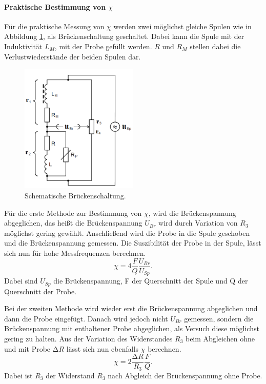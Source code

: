 \paragraph{Praktische Bestimmung von $\chi$}
Für die praktische Messung von $\chi$ werden zwei möglichst gleiche Spulen wie in Abbildung \ref{fig:1}, als Brückenschaltung 
geschaltet. Dabei kann die Spule mit der Induktivität $L_M$, mit der Probe gefüllt werden. $R$ und $R_M$ stellen dabei die Verlustwiederstände der 
beiden Spulen dar.
\begin{figure}
    \centering
    \includegraphics[width = 0.50\textwidth]{V606Bild1.png}
    \caption{Schematische Brückenschaltung.}
    \label{fig:1}
\end{figure}
Für die erste Methode zur Bestimmung von $\chi$, wird die Brückenspannung abgeglichen, das heißt die Brückenspannung $U_{Br}$ wird durch Variation von $R_3$ möglichst gering gewählt.
Anschließend wird die Probe in die Spule geschoben und die Brückenspannung gemessen.
Die Suszibilität der Probe in der Spule, lässt sich nun für hohe Messfrequenzen berechnen.
\begin{equation}
    \label{equ:8}
    \chi = 4 \frac{F}{Q} \frac{U_{Br}}{U_{Sp}}.
\end{equation}
Dabei sind $U_{Sp}$ die Brückenspannung, F der Querschnitt der Spule und Q der Querschnitt der Probe.

Bei der zweiten Methode wird wieder erst die Brückenspannung abgeglichen und dann die Probe eingefügt. Danach wird jedoch nicht $U_{Br}$ gemessen, 
sondern die Brückenspannung mit enthaltener Probe abgeglichen, als Versuch diese möglichst gering zu halten. 
Aus der Variation des Widerstandes $R_3$ beim Abgleichen ohne und mit Probe $\increment R$ lässt sich nun ebenfalls $\chi$ berechnen.
\begin{equation}
    \label{equ:9}
    \chi = 2 \frac{\increment R }{R_3} \frac{F}{Q}.
\end{equation}
Dabei ist $R_3$ der Widerstand $R_3$ nach Abgleich der Brückenspannung ohne Probe.

